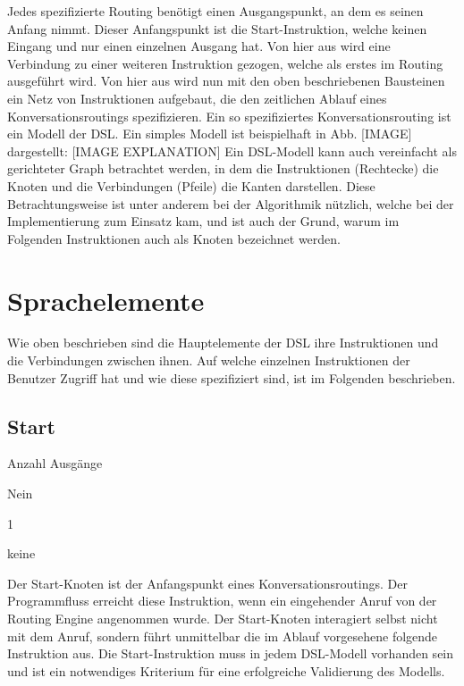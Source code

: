 \newline
Jedes spezifizierte Routing benötigt einen Ausgangspunkt, an dem es seinen Anfang nimmt. Dieser Anfangspunkt ist die Start-Instruktion, welche keinen Eingang und nur einen einzelnen Ausgang hat. Von hier aus wird eine Verbindung zu einer weiteren Instruktion gezogen, welche als erstes im Routing ausgeführt wird. Von hier aus wird nun mit den oben beschriebenen Bausteinen ein Netz von Instruktionen aufgebaut, die den zeitlichen Ablauf eines Konversationsroutings spezifizieren. Ein so spezifiziertes Konversationsrouting ist ein Modell der DSL. Ein simples Modell ist beispielhaft in Abb. [IMAGE] dargestellt: [IMAGE EXPLANATION]
\newline
Ein DSL-Modell kann auch vereinfacht als gerichteter Graph betrachtet werden, in dem die Instruktionen (Rechtecke) die Knoten und die Verbindungen (Pfeile) die Kanten darstellen. Diese Betrachtungsweise ist unter anderem bei der Algorithmik nützlich, welche bei der Implementierung zum Einsatz kam, und ist auch der Grund, warum im Folgenden Instruktionen auch als Knoten bezeichnet werden. 

\section{Sprachelemente}
\label{sec:Sprachelemente}
Wie oben beschrieben sind die Hauptelemente der DSL ihre Instruktionen und die Verbindungen zwischen ihnen. Auf welche einzelnen Instruktionen der Benutzer Zugriff hat und wie diese spezifiziert sind, ist im Folgenden beschrieben. 

\subsection{Start}
\begin{labeling}{Anzahl Ausgänge}
\item [Eingang] Nein
\item [Anzahl Ausgänge] 1
\item [Parameter] keine
\item [Beschreibung] Der Start-Knoten ist der Anfangspunkt eines Konversationsroutings. Der Programmfluss erreicht diese Instruktion, wenn ein eingehender Anruf von der Routing Engine angenommen wurde. Der Start-Knoten interagiert selbst nicht mit dem Anruf, sondern führt unmittelbar die im Ablauf vorgesehene folgende Instruktion aus. Die Start-Instruktion muss in jedem DSL-Modell vorhanden sein und ist ein notwendiges Kriterium für eine erfolgreiche Validierung des Modells. 
\end{labeling}

